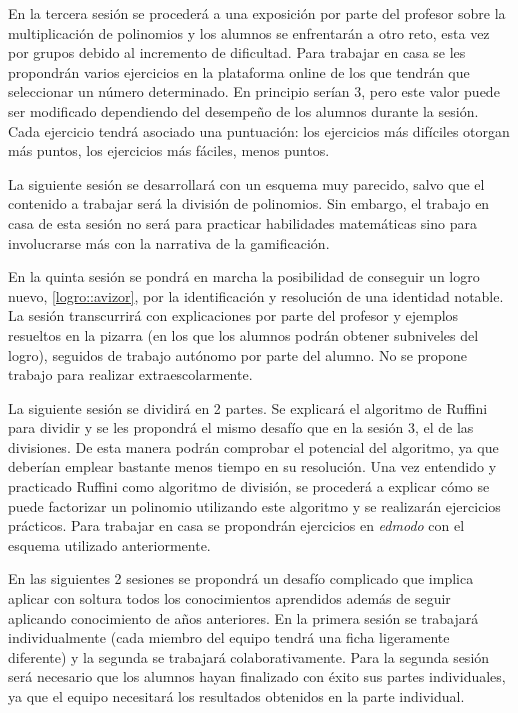 \label{ResumenSesion3}
%
En la tercera sesión se procederá a una exposición por parte del profesor sobre la multiplicación de polinomios y los alumnos se enfrentarán a otro reto, esta vez por grupos debido al incremento de dificultad.
%
Para trabajar en casa se les propondrán varios ejercicios en la plataforma online de los que tendrán que seleccionar un número determinado. 
%
En principio serían 3, pero este valor puede ser modificado dependiendo del desempeño de los alumnos durante la sesión.
%
Cada ejercicio tendrá asociado una puntuación: los ejercicios más difíciles otorgan más puntos, los ejercicios más fáciles, menos puntos.

\label{ResumenSesion4}
%
La siguiente sesión se desarrollará con un esquema muy parecido, salvo que el contenido a trabajar será la división de polinomios.
%
Sin embargo, el trabajo en casa de esta sesión no será para practicar habilidades matemáticas sino para involucrarse más con la narrativa de la gamificación.

\label{ResumenSesion5}
%
En la quinta sesión se pondrá en marcha la posibilidad de conseguir un logro nuevo, \ref{logro::avizor}, por la identificación y resolución de una identidad notable.
%
La sesión transcurrirá con explicaciones por parte del profesor y ejemplos resueltos en la pizarra (en los que los alumnos podrán obtener subniveles del logro), seguidos de trabajo autónomo por parte del alumno.
%
No se propone trabajo para realizar extraescolarmente.

\label{ResumenSesion6}
%
La siguiente sesión se dividirá en 2 partes. 
%
Se explicará el algoritmo de Ruffini para dividir y se les propondrá el mismo desafío que en la sesión 3, el de las divisiones.
%
De esta manera podrán comprobar el potencial del algoritmo, ya que deberían emplear bastante menos tiempo en su resolución.
%
Una vez entendido y practicado Ruffini como algoritmo de división, se procederá a explicar cómo se puede factorizar un polinomio utilizando este algoritmo y se realizarán ejercicios prácticos.
%
Para trabajar en casa se propondrán ejercicios en \textit{edmodo} con el esquema utilizado anteriormente.
%


\label{ResumenSesion7}
%
\label{ResumenSesion8}
%
En las siguientes 2 sesiones se propondrá un desafío complicado que implica aplicar con soltura todos los conocimientos aprendidos además de seguir aplicando conocimiento de años anteriores.
%
En la primera sesión se trabajará individualmente (cada miembro del equipo tendrá una ficha ligeramente diferente) y la segunda se trabajará colaborativamente.
%
Para la segunda sesión será necesario que los alumnos hayan finalizado con éxito sus partes individuales, ya que el equipo necesitará los resultados obtenidos en la parte individual.


